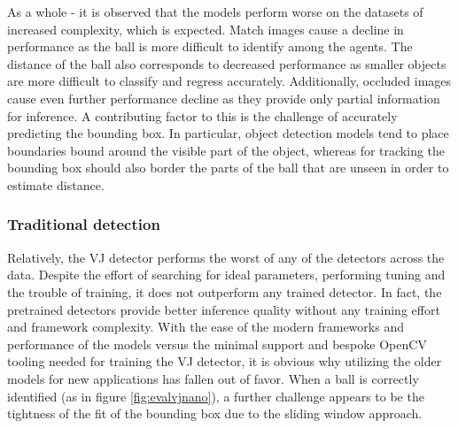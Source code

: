 \documentclass[a4paper,twoside,12pt]{report}
\begin{document}
As a whole - it is observed that the models perform worse on the datasets of increased complexity, which is expected. Match images cause a decline in performance as the ball is more difficult to identify among the agents. The distance of the ball also corresponds to decreased performance as smaller objects are more difficult to classify and regress accurately. Additionally, occluded images cause even further performance decline as they provide only partial information for inference. A contributing factor to this is the challenge of accurately predicting the bounding box. In particular, object detection models tend to place boundaries bound around the visible part of the object, whereas for tracking the bounding box should also border the parts of the ball that are unseen in order to estimate distance. 

\subsubsection{Traditional detection}

Relatively, the VJ detector performs the worst of any of the detectors across the data. Despite the effort of searching for ideal parameters, performing tuning and the trouble of training, it does not outperform any trained detector. In fact, the pretrained detectors provide better inference quality without any training effort and framework complexity. With the ease of the modern frameworks and performance of the models versus the minimal support and bespoke OpenCV tooling needed for training the VJ detector, it is obvious why utilizing the older models for new applications has fallen out of favor. When a ball is correctly identified (as in figure \ref{fig:evalvjnano}), a further challenge appears to be the tightness of the fit of the bounding box due to the sliding window approach.
\end{document}
